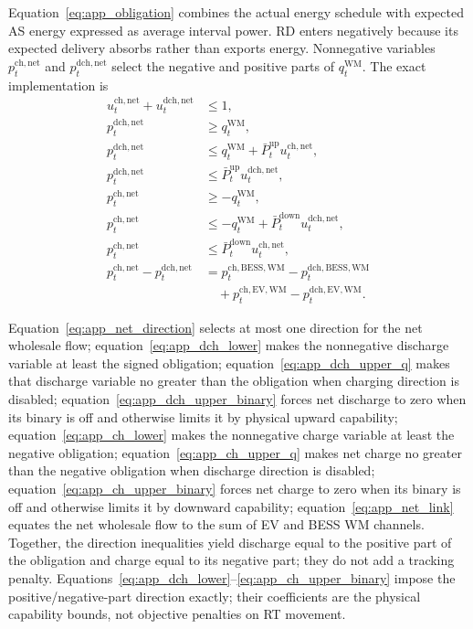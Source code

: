\documentclass[final,5p,times]{elsarticle}
\newcommand{\EV}{\mathrm{EV}}
\newcommand{\BESS}{\mathrm{BESS}}
\newcommand{\WM}{\mathrm{WM}}
\newcommand{\net}{\mathrm{net}}
\newcommand{\ch}{\mathrm{ch}}
\newcommand{\dch}{\mathrm{dch}}
\begin{document}
Equation~\eqref{eq:app_obligation} combines the actual energy schedule with expected AS energy expressed as average interval power. RD enters negatively because its expected delivery absorbs rather than exports energy.
Nonnegative variables $p_t^{\ch,\net}$ and $p_t^{\dch,\net}$ select the
negative and positive parts of $q_t^{\WM}$. The exact
implementation is
\begin{align}
u_t^{\ch,\net}+u_t^{\dch,\net}&\le1, \label{eq:app_net_direction}\\
p_t^{\dch,\net}&\ge q_t^{\WM}, \label{eq:app_dch_lower}\\
p_t^{\dch,\net}&\le q_t^{\WM}+\bar P_t^{\mathrm{up}}u_t^{\ch,\net}, \label{eq:app_dch_upper_q}\\
p_t^{\dch,\net}&\le\bar P_t^{\mathrm{up}}u_t^{\dch,\net}, \label{eq:app_dch_upper_binary}\\
p_t^{\ch,\net}&\ge-q_t^{\WM}, \label{eq:app_ch_lower}\\
p_t^{\ch,\net}&\le-q_t^{\WM}+\bar P_t^{\mathrm{down}}u_t^{\dch,\net}, \label{eq:app_ch_upper_q}\\
p_t^{\ch,\net}&\le\bar P_t^{\mathrm{down}}u_t^{\ch,\net}, \label{eq:app_ch_upper_binary}\\
p_t^{\ch,\net}-p_t^{\dch,\net}
&=p_t^{\ch,\BESS,\WM}-p_t^{\dch,\BESS,\WM}\nonumber\\
&\quad+p_t^{\ch,\EV,\WM}-p_t^{\dch,\EV,\WM}. \label{eq:app_net_link}
\end{align}

Equation~\eqref{eq:app_net_direction} selects at most one direction for the net wholesale flow; equation~\eqref{eq:app_dch_lower} makes the nonnegative discharge variable at least the signed obligation; equation~\eqref{eq:app_dch_upper_q} makes that discharge variable no greater than the obligation when charging direction is disabled; equation~\eqref{eq:app_dch_upper_binary} forces net discharge to zero when its binary is off and otherwise limits it by physical upward capability; equation~\eqref{eq:app_ch_lower} makes the nonnegative charge variable at least the negative obligation; equation~\eqref{eq:app_ch_upper_q} makes net charge no greater than the negative obligation when discharge direction is disabled; equation~\eqref{eq:app_ch_upper_binary} forces net charge to zero when its binary is off and otherwise limits it by downward capability; equation~\eqref{eq:app_net_link} equates the net wholesale flow to the sum of EV and BESS WM channels. Together, the direction inequalities yield discharge equal to the positive part of the obligation and charge equal to its negative part; they do not add a tracking penalty.
Equations~\eqref{eq:app_dch_lower}--\eqref{eq:app_ch_upper_binary} impose the
positive/negative-part direction exactly; their coefficients are the physical
capability bounds, not objective penalties on RT movement.
\end{document}

